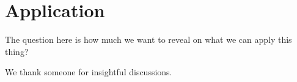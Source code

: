 \documentclass[aps,pre,twocolumn,superscriptaddress]{revtex4-1}
\begin{document}
\section{Application}

The question here is how much we want to reveal on what we can apply this thing?

\acknowledgments
We thank someone for insightful discussions.

\appendix

%


\end{document}
